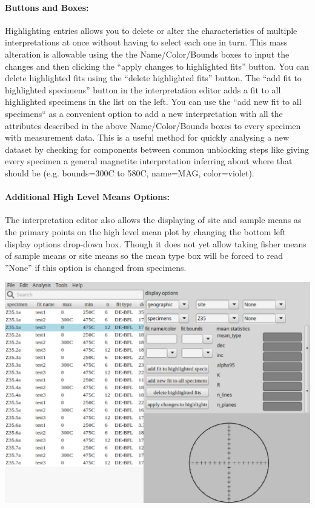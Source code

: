 \documentclass[11pt]{book}
\begin{document}
{{\paragraph{Buttons and Boxes:}\label{IE-buttons} Highlighting entries allows you to delete or alter the characteristics of multiple interpretations at once without having to select each one in turn. This mass alteration is allowable using the the Name/Color/Bounds boxes to input the changes and then clicking the ``apply changes to highlighted fits'' button. You can delete highlighted fits using the ``delete highlighted fits'' button. The ``add fit to highlighted specimens'' button in the interpretation editor adds a fit to all highlighted specimens in the list on the left. You can use the ``add new fit to all specimens`` as a convenient option to add a new interpretation with all the attributes described in the above Name/Color/Bounds boxes to every specimen with measurement data. This is a useful method for quickly analysing a new dataset by checking for components between common unblocking steps like giving every specimen a general magnetite interpretation inferring about where that should be (e.g. bounds=300C to 580C, name=MAG, color=violet).
\paragraph{Additional High Level Means Options:}\label{IE-HLM-options} The interpretation editor also allows the displaying of site and sample means as the primary points on the high level mean plot by changing the bottom left display options drop-down box. Though it does not yet allow taking fisher means of sample means or site means so the mean type box will be forced to read ''None'' if this option is changed from specimens.

\includegraphics[width=15 cm]{EPSFiles/demag_gui_InterpEditor.eps}

}}
\end{document}
